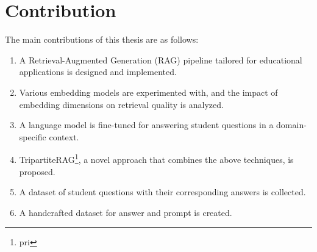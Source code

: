 \section{Contribution}

The main contributions of this thesis are as follows:

\begin{enumerate}
    \item A Retrieval-Augmented Generation (RAG) \cite{lewis2020retrieval} pipeline tailored for educational applications is designed and implemented.
    \item Various embedding models are experimented with, and the impact of embedding dimensions on retrieval quality is analyzed.
    \item A language model is fine-tuned for answering student questions in a domain-specific context.
    \item TripartiteRAG\footnote{pri}, a novel approach that combines the above techniques, is proposed.
    \item A dataset of student questions with their corresponding answers is collected.
    \item A handcrafted dataset for answer and prompt is created.
\end{enumerate}
